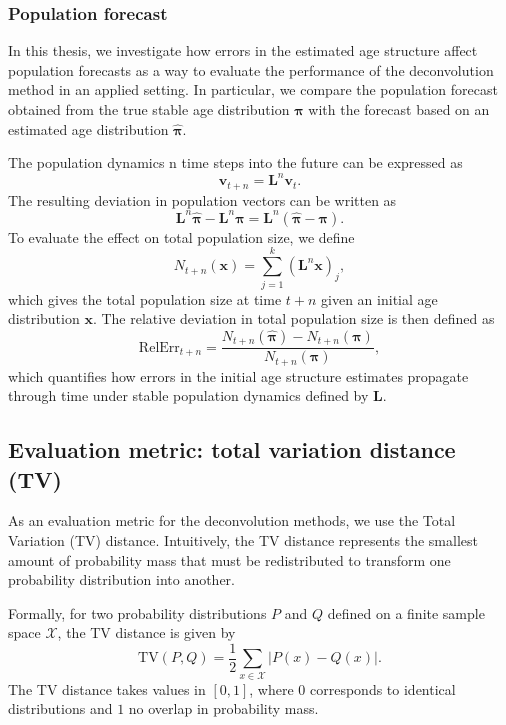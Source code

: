 \documentclass[11pt,a4paper]{article}
\begin{document}
\subsubsection{Population forecast} \label{subsub:forcast}

In this thesis, we investigate how errors in the estimated age structure affect population forecasts as a way to evaluate the performance of the deconvolution method in an applied setting. In particular, we compare the population forecast obtained from the true stable age distribution $\boldsymbol{\pi}$ with the forecast based on an estimated age distribution $\hat{\boldsymbol{\pi}}$.

The population dynamics n time steps into the future can be expressed as
\[
\mathbf{v}_{t+n} = \mathbf{L}^n \mathbf{v}_t.
\]
The resulting deviation in population vectors can be written as
\[
\mathbf{L}^n \hat{\boldsymbol{\pi}} - \mathbf{L}^n \boldsymbol{\pi}
= \mathbf{L}^n (\hat{\boldsymbol{\pi}} - \boldsymbol{\pi}).
\]
To evaluate the effect on total population size, we define
\[
N_{t+n}(\boldsymbol{x}) = \sum_{j=1}^k \left(\mathbf{L}^n \boldsymbol{x}\right)_j,
\]
which gives the total population size at time $t+n$ given an initial age distribution $\boldsymbol{x}$. The relative deviation in total population size is then defined as
\begin{equation}
\mathrm{RelErr}_{t+n}
=
\frac{
	N_{t+n}(\hat{\boldsymbol{\pi}}) - N_{t+n}(\boldsymbol{\pi})
}{
	N_{t+n}(\boldsymbol{\pi})
},
\label{eq:rel_tot_pop_dev}
\end{equation}
which quantifies how errors in the initial age structure estimates propagate through time under stable population dynamics defined by $\mathbf{L}$.


\subsection{Evaluation metric: total variation distance (TV)}\label{sec:eva_method}

As an evaluation metric for the deconvolution methods, we use the Total Variation (TV) distance. Intuitively, the TV distance represents the smallest amount of probability mass that must be redistributed to transform one probability distribution into another.

Formally, for two probability distributions $P$ and $Q$ defined on a finite sample space $\mathcal{X}$, the TV distance is given by
\[
\text{TV}(P,Q) = \frac{1}{2} \sum_{x \in \mathcal{X}} |P(x) - Q(x)|.
\]
The TV distance takes values in $[0,1]$, where $0$ corresponds to identical distributions and $1$ no overlap in probability mass.
\end{document}
